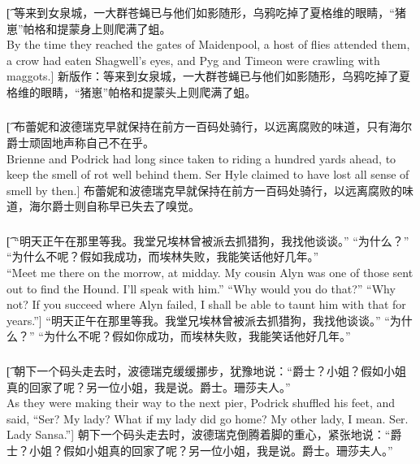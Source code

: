 \documentclass[12pt,a4paper]{article}
\begin{document}
\subsubsection{}\t[
	等来到女泉城，一大群苍蝇已与他们如影随形，乌鸦吃掉了夏格维的眼睛，“猪崽”帕格和提蒙身上则爬满了蛆。\\
	By the time they reached the gates of Maidenpool, a host of flies attended them, a crow had eaten Shagwell's eyes, and Pyg and Timeon were crawling with maggots.]
	新版作：等来到女泉城，一大群苍蝇已与他们如影随形，乌鸦吃掉了夏格维的眼睛，“猪崽”帕格和提蒙头上则爬满了蛆。
	
\subsubsection{}\t[
	布蕾妮和波德瑞克早就保持在前方一百码处骑行，以远离腐败的味道，只有海尔爵士顽固地声称自己不在乎。\\
	Brienne and Podrick had long since taken to riding a hundred yards ahead, to keep the smell of rot well behind them. Ser Hyle claimed to have lost all sense of smell by then.]
	布蕾妮和波德瑞克早就保持在前方一百码处骑行，以远离腐败的味道，海尔爵士则自称早已失去了嗅觉。
	
\subsubsection{}\t[
	“明天正午在那里等我。我堂兄埃林曾被派去抓猎狗，我找他谈谈。”
	“为什么？”
	“为什么不呢？假如我成功，而埃林失败，我能笑话他好几年。”\\
	“Meet me there on the morrow, at midday. My cousin Alyn was one of those sent out to find the Hound. I'll speak with him.”
	“Why would you do that?”
	“Why not? If you succeed where Alyn failed, I shall be able to taunt him with that for years.”]
	“明天正午在那里等我。我堂兄埃林曾被派去抓猎狗，我找他谈谈。”
	“为什么？”
	“为什么不呢？假如你成功，而埃林失败，我能笑话他好几年。”
		
\subsubsection{}\t[	
	朝下一个码头走去时，波德瑞克缓缓挪步，犹豫地说：“爵士？小姐？假如小姐真的回家了呢？另一位小姐，我是说。爵士。珊莎夫人。”\\
	As they were making their way to the next pier, Podrick shuffled his feet, and said, “Ser? My lady? What if my lady did go home? My other lady, I mean. Ser. Lady Sansa.”]
	朝下一个码头走去时，波德瑞克倒腾着脚的重心，紧张地说：“爵士？小姐？假如小姐真的回家了呢？另一位小姐，我是说。爵士。珊莎夫人。”
		
\end{document}

